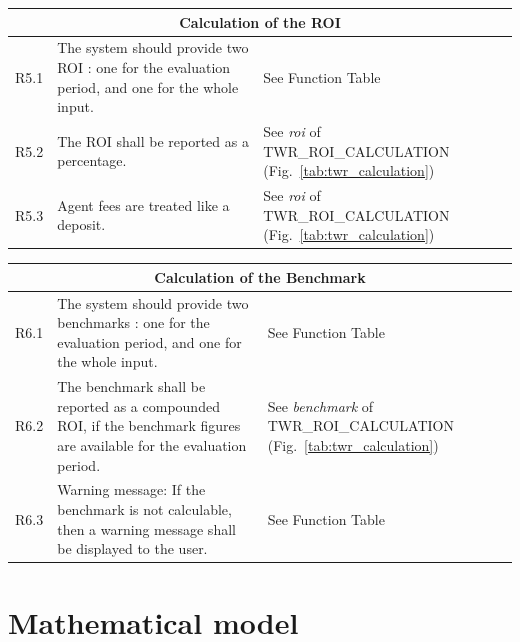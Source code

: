 \documentclass[runningheads,12pt]{article}
\begin{document}
{\begin{longtable}{|l|p{9cm}|p{5cm}|}
\hline
\multicolumn{3}{|c|}{\textbf{Calculation of the ROI}} \\

\hline
R5.1 & The system should provide two ROI : one for the evaluation period, and one for the whole input. & See Function Table\\

\hline
R5.2 & The ROI shall be reported as a percentage. & See \textit{roi} of TWR\_ROI\_CALCULATION (Fig.~\ref{tab:twr_calculation})\\

\hline
R5.3 & Agent fees are treated like a deposit. & See \textit{roi} of TWR\_ROI\_CALCULATION (Fig.~\ref{tab:twr_calculation})\\

\hline
\end{longtable}
\centering
\begin{longtable}{|l|p{9cm}|p{5cm}|}

\hline
\multicolumn{3}{|c|}{\textbf{Calculation of the Benchmark}} \\

\hline
R6.1 & The system should provide two benchmarks : one for the evaluation period, and one for the whole input. & See Function Table\\

\hline
R6.2 & The benchmark shall be reported as a compounded ROI, if the benchmark figures are available for the evaluation period. & See \textit{benchmark} of TWR\_ROI\_CALCULATION (Fig.~\ref{tab:twr_calculation})\\

\hline
R6.3 & Warning message: If the benchmark is not calculable, then a warning message shall be displayed to the user. & See Function Table\\



\hline
\end{longtable}
}

\newpage

\section{Mathematical model}
\end{document}
